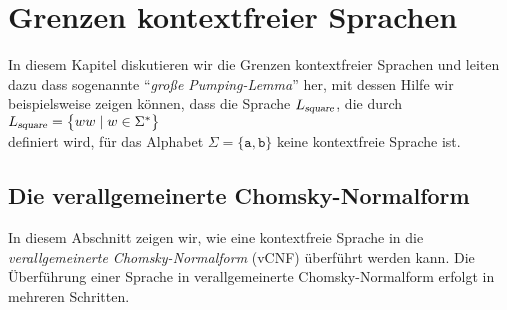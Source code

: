 \chapter{Grenzen kontextfreier Sprachen} 
In diesem Kapitel diskutieren wir die Grenzen kontextfreier Sprachen und leiten dazu dass
sogenannte ``\emph{gro{\ss}e Pumping-Lemma}'' her, mit dessen Hilfe wir beispielsweise zeigen
k\"onnen, dass die Sprache $L_{\mbox{\scriptsize \textsl{square}}}$, die durch
\\[0.2cm]
\hspace*{1.3cm} $L_{\mbox{\scriptsize \textsl{square}}} = \bigl\{ ww \mid w \in \Sigma^*\bigr\}$
\\[0.2cm]
definiert wird, f\"ur das Alphabet $\Sigma =\{\texttt{a}, \texttt{b}\}$ keine kontextfreie Sprache ist.


\section{Die verallgemeinerte Chomsky-Normalform}
In diesem Abschnitt zeigen wir, wie eine kontextfreie Sprache in die \emph{verallgemeinerte Chomsky-Normal\-form}
(vCNF) \"uberf\"uhrt werden kann.  Die \"Uberf\"uhrung einer Sprache in verallgemeinerte
Chomsky-Normalform erfolgt in mehreren Schritten.
